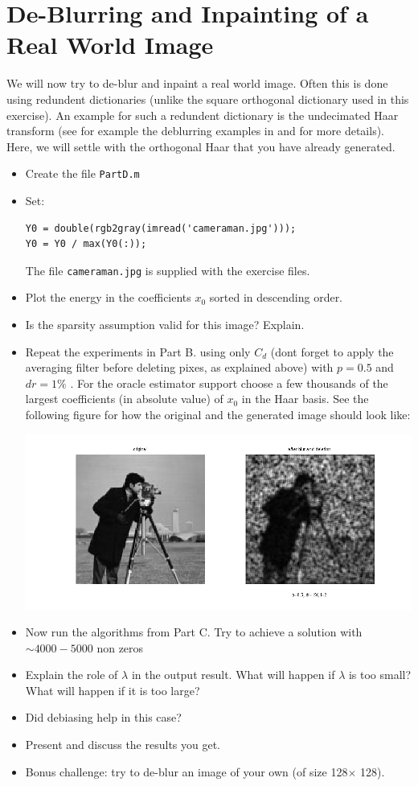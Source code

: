 \documentclass[]{article}
\newcommand{\code}{\item[\faKeyboardO]}
\newcommand{\quest}{\item[\faPencil]}
\begin{document}
\section{De-Blurring and Inpainting of a Real World Image}
We will now try to de-blur and inpaint a real world image. Often this is done using redundent dictionaries (unlike the square orthogonal dictionary used in this exercise). An example for such a redundent dictionary is the undecimated Haar transform (see for example the deblurring  examples in \cite{beck2009fast} and \cite{giryes2011projected} for more details). Here, we will settle with the orthogonal Haar that you have already generated.   
\begin{itemize}
	\code Create the file \lstinline|PartD.m|
	\item Set: 
\begin{lstlisting}
Y0 = double(rgb2gray(imread('cameraman.jpg')));
Y0 = Y0 / max(Y0(:));
\end{lstlisting}
The file \lstinline|cameraman.jpg| is supplied with the exercise files.
\code Plot the energy in the coefficients $x_0$ sorted in descending order. 
\quest Is the sparsity assumption valid for this image? Explain.   
\item Repeat the experiments in Part B. {\color{blue} using only $C_d$ (dont forget to apply the averaging filter before deleting pixes, as explained above) with $p=0.5$ and $dr=1\%$} . For the oracle estimator support choose a few thousands of the largest coefficients (in absolute value) of $x_0$ in the Haar basis. {\color{blue} See the following figure for how the original and the generated image should look like:} 

{\centering\includegraphics[width=\linewidth]{figs/cm}}


\item Now run the algorithms from Part C. {\color{blue} Try to achieve a solution with  $\sim 4000-5000$ non zeros} 
\quest Explain the role of $\lambda$ in the output result. What will happen if $\lambda$ is too small? What will happen if it is too large? 
\quest {\color{blue} Did debiasing help in this case?} 
\quest Present and discuss the results you get. 
\code Bonus challenge: try to de-blur an image of your own (of size 128$\times$ 128). 
\end{itemize}
\end{document}

